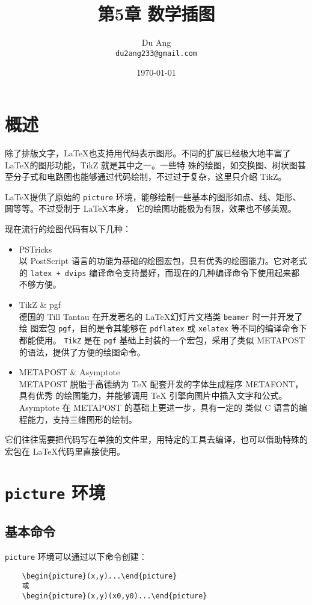 \documentclass[UTF8]{ctexart}
\title{\heiti 第5章 \quad 数学插图}
\author{\kaishu Du Ang \\ \texttt{du2ang233@gmail.com} }
\date{\today}
\begin{document}
\maketitle

\tableofcontents

\newpage

\section{概述}
除了排版文字，\LaTeX 也支持用代码表示图形。不同的扩展已经极大地丰富了 \LaTeX 的图形功能，TikZ 就是其中之一。一些特
殊的绘图，如交换图、树状图甚至分子式和电路图也能够通过代码绘制，不过过于复杂，这里只介绍 TikZ。

\LaTeX 提供了原始的 \texttt{picture} 环境，能够绘制一些基本的图形如点、线、矩形、圆等等。不过受制于 \LaTeX 本身，
它的绘图功能极为有限，效果也不够美观。

现在流行的绘图代码有以下几种：
\begin{itemize}
    \item PSTricks \\ 以 PostScript 语言的功能为基础的绘图宏包，具有优秀的绘图能力。它对老式的
    \texttt{latex + dvips} 编译命令支持最好，而现在的几种编译命令下使用起来都不够方便。
    \item TikZ \& pgf \\ 德国的 Till Tantau 在开发著名的 \LaTeX 幻灯片文档类 \texttt{beamer} 时一并开发了绘
    图宏包 \texttt{pgf}，目的是令其能够在 \texttt{pdflatex} 或 \texttt{xelatex} 等不同的编译命令下都能使用。
    \texttt{TikZ} 是在 \texttt{pgf} 基础上封装的一个宏包，采用了类似 METAPOST 的语法，提供了方便的绘图命令。
    \item METAPOST \& Asymptote \\ METAPOST 脱胎于高德纳为 \TeX{} 配套开发的字体生成程序 METAFONT，具有优秀
    的绘图能力，并能够调用 \TeX{} 引擎向图片中插入文字和公式。Asymptote 在 METAPOST 的基础上更进一步，具有一定的
    类似 C 语言的编程能力，支持三维图形的绘制。
\end{itemize}

它们往往需要把代码写在单独的文件里，用特定的工具去编译，也可以借助特殊的宏包在 \LaTeX 代码里直接使用。

\section{\texttt{picture} 环境}
\subsection{基本命令}
\texttt{picture} 环境可以通过以下命令创建：
\begin{verbatim}
    \begin{picture}(x,y)...\end{picture}
    或
    \begin{picture}(x,y)(x0,y0)...\end{picture}
\end{verbatim}
\end{document}
